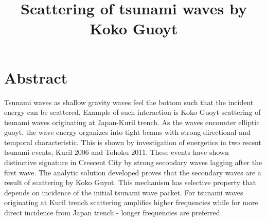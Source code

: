 



\title{Scattering of tsunami waves by Koko Guoyt}
\maketitle

\section*{Abstract}
Tsunami waves as shallow gravity waves feel the bottom such that the incident energy can be scattered. Example of such interaction is Koko Guoyt scattering of tsunami waves originating at Japan-Kuril trench. As the waves encounter elliptic guoyt, the wave energy organizes into tight beams with strong directional and temporal characteristic. This is shown by investigation of energetics in two recent tsunami events, Kuril 2006 and Tohoku 2011. These events have shown distinctive signature in Crescent City by strong secondary waves lagging after the first wave. The analytic solution developed proves that the secondary waves are a result of scattering by Koko Guyot. This mechanism has selective property that depends on incidence of the initial tsunami wave packet. For tsunami waves originating at Kuril trench scattering amplifies higher frequencies while for more direct incidence from Japan trench - longer frequencies are preferred.

